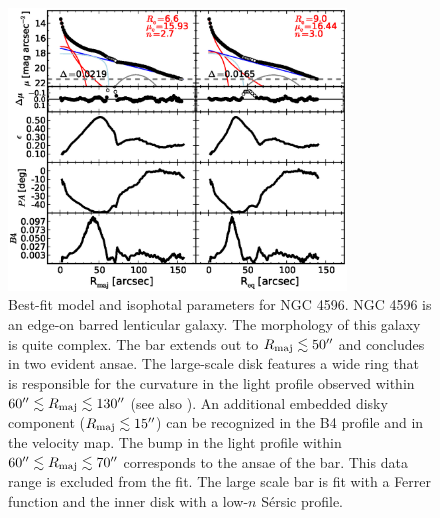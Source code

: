 \documentclass[preprint2]{emulateapj}
\newcommand{\fitfigurewidth}{0.8\textwidth}
\begin{document}
  \begin{figure}[h]
  \begin{center}
  \includegraphics[width=\fitfigurewidth]{images/n4596_1Dfit.eps}
  \caption{Best-fit model and isophotal parameters for NGC 4596.
  NGC 4596 is an edge-on barred lenticular galaxy.
  The morphology of this galaxy is quite complex. 
  The bar extends out to $R_{\rm maj} \lesssim 50''$ and concludes in two evident ansae.
  The large-scale disk features a wide ring that is responsible for the curvature in the light profile observed within 
  $60'' \lesssim R_{\rm maj} \lesssim 130''$ (see also \citealt{comeron2014}).
  An additional embedded disky component ($R_{\rm maj} \lesssim 15''$) can be recognized in the B4 profile and in the velocity map.
  The bump in the light profile within $60'' \lesssim R_{\rm maj} \lesssim 70''$ corresponds to the ansae of the bar.
  This data range is excluded from the fit.
  The large scale bar is fit with a Ferrer function and the inner disk with a low-$n$ S\'ersic profile.
  }
  \end{center}
  \end{figure}
\end{document}
